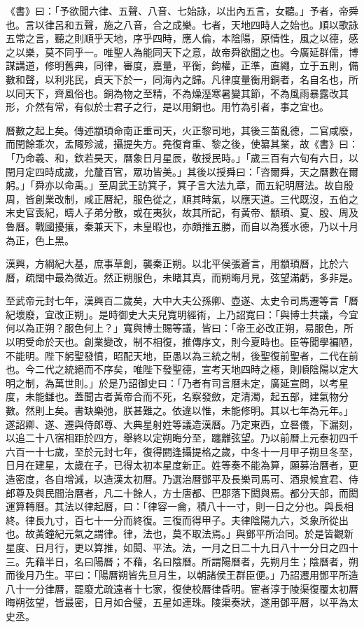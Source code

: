 \begin{pinyinscope}
《書》曰：「予欲聞六律、五聲、八音、七始詠，以出內五言，女聽。」予者，帝舜也。言以律呂和五聲，施之八音，合之成樂。七者，天地四時人之始也。順以歌詠五常之言，聽之則順乎天地，序乎四時，應人倫，本陰陽，原情性，風之以德，感之以樂，莫不同乎一。唯聖人為能同天下之意，故帝舜欲聞之也。今廣延群儒，博謀講道，修明舊典，同律，審度，嘉量，平衡，鈞權，正準，直繩，立于五則，備數和聲，以利兆民，貞天下於一，同海內之歸。凡律度量衡用銅者，名自名也，所以同天下，齊風俗也。銅為物之至精，不為燥溼寒暑變其節，不為風雨暴露改其形，介然有常，有似於士君子之行，是以用銅也。用竹為引者，事之宜也。

曆數之起上矣。傳述顓頊命南正重司天，火正黎司地，其後三苗亂德，二官咸廢，而閏餘乖次，孟陬殄滅，攝提失方。堯復育重、黎之後，使纂其業，故《書》曰：「乃命羲、和，欽若昊天，曆象日月星辰，敬授民時。」「歲三百有六旬有六日，以閏月定四時成歲，允釐百官，眾功皆美。」其後以授舜曰：「咨爾舜，天之曆數在爾躬。」「舜亦以命禹。」至周武王訪箕子，箕子言大法九章，而五紀明曆法。故自殷周，皆創業改制，咸正曆紀，服色從之，順其時氣，以應天道。三代既沒，五伯之末史官喪紀，疇人子弟分散，或在夷狄，故其所記，有黃帝、顓頊、夏、殷、周及魯曆。戰國擾攘，秦兼天下，未皇暇也，亦頗推五勝，而自以為獲水德，乃以十月為正，色上黑。

漢興，方綱紀大基，庶事草創，襲秦正朔。以北平侯張蒼言，用顓頊曆，比於六曆，疏闊中最為微近。然正朔服色，未睹其真，而朔晦月見，弦望滿虧，多非是。

至武帝元封七年，漢興百二歲矣，大中大夫公孫卿、壺遂、太史令司馬遷等言「曆紀壞廢，宜改正朔」。是時御史大夫兒寬明經術，上乃詔寬曰：「與博士共議，今宜何以為正朔？服色何上？」寬與博士賜等議，皆曰：「帝王必改正朔，易服色，所以明受命於天也。創業變改，制不相復，推傳序文，則今夏時也。臣等聞學褊陋，不能明。陛下躬聖發憤，昭配天地，臣愚以為三統之制，後聖復前聖者，二代在前也。今二代之統絕而不序矣，唯陛下發聖德，宣考天地四時之極，則順陰陽以定大明之制，為萬世則。」於是乃詔御史曰：「乃者有司言曆未定，廣延宣問，以考星度，未能讎也。蓋聞古者黃帝合而不死，名察發斂，定清濁，起五部，建氣物分數。然則上矣。書缺樂弛，朕甚難之。依違以惟，未能修明。其以七年為元年。」遂詔卿、遂、遷與侍郎尊、大典星射姓等議造漢曆。乃定東西，立晷儀，下漏刻，以追二十八宿相距於四方，舉終以定朔晦分至，躔離弦望。乃以前曆上元泰初四千六百一十七歲，至於元封七年，復得閼逢攝提格之歲，中冬十一月甲子朔旦冬至，日月在建星，太歲在子，已得太初本星度新正。姓等奏不能為算，願募治曆者，更造密度，各自增減，以造漢太初曆。乃選治曆鄧平及長樂司馬可、酒泉候宜君、侍郎尊及與民間治曆者，凡二十餘人，方士唐都、巴郡落下閎與焉。都分天部，而閎運算轉曆。其法以律起曆，曰：「律容一龠，積八十一寸，則一日之分也。與長相終。律長九寸，百七十一分而終復。三復而得甲子。夫律陰陽九六，爻象所從出也。故黃鐘紀元氣之謂律。律，法也，莫不取法焉。」與鄧平所治同。於是皆觀新星度、日月行，更以算推，如閎、平法。法，一月之日二十九日八十一分日之四十三。先藉半日，名曰陽曆；不藉，名曰陰曆。所謂陽曆者，先朔月生；陰曆者，朔而後月乃生。平曰：「陽曆朔皆先旦月生，以朝諸侯王群臣便。」乃詔遷用鄧平所造八十一分律曆，罷廢尤疏遠者十七家，復使校曆律昏明。宦者淳于陵渠復覆太初曆晦朔弦望，皆最密，日月如合璧，五星如連珠。陵渠奏狀，遂用鄧平曆，以平為太史丞。


\end{pinyinscope}
